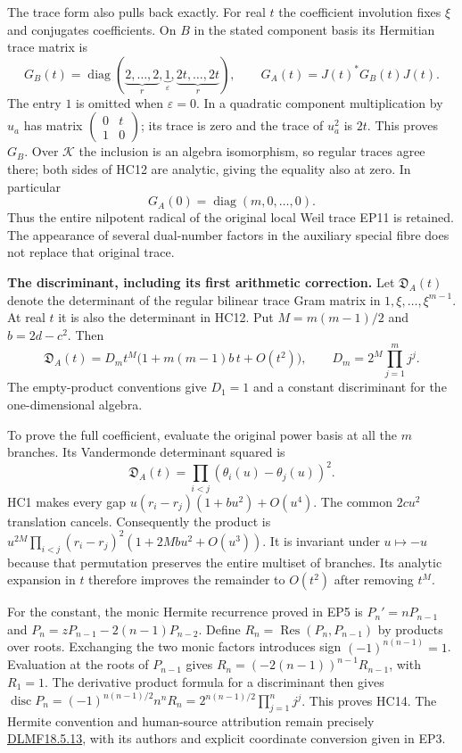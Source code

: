 The trace form also pulls back exactly. For real $t$ the coefficient
involution fixes $\xi$ and conjugates coefficients. On $B$ in the
stated component basis its Hermitian trace matrix is
\[
 G_B(t)=\operatorname{diag}
      (\underbrace{2,\ldots,2}_{r},
        \underbrace{1}_{\varepsilon},
        \underbrace{2t,\ldots,2t}_{r}),
 \qquad G_A(t)=J(t)^*G_B(t)J(t).
 \tag{HC12}
\]
The entry $1$ is omitted when $\varepsilon=0$. In a quadratic
component multiplication by $u_a$ has matrix
$\left(\begin{smallmatrix}0&t\\1&0\end{smallmatrix}\right)$;
its trace is zero and the trace of $u_a^2$ is $2t$. This proves
$G_B$. Over $\mathcal K$ the inclusion is an algebra isomorphism,
so regular traces agree there; both sides of HC12 are analytic,
giving the equality also at zero. In particular
\[
 G_A(0)=\operatorname{diag}(m,0,\ldots,0).
 \tag{HC13}
\]
Thus the entire nilpotent radical of the original local Weil trace
EP11 is retained. The appearance of several dual-number factors
in the auxiliary special fibre does not replace that original trace.

\HC\textbf{The discriminant, including its first arithmetic correction.}
Let $\mathfrak D_A(t)$ denote the determinant of the regular
bilinear trace Gram matrix in $1,\xi,\ldots,\xi^{m-1}$.
At real $t$ it is also the determinant in HC12. Put
$M=m(m-1)/2$ and $b=2d-c^2$. Then
\[
 \boxed{\mathfrak D_A(t)=D_m t^M
      \bigl(1+m(m-1)b\,t+O(t^2)\bigr),\qquad
 D_m=2^M\prod_{j=1}^m j^j.}
 \tag{HC14}
\]
The empty-product conventions give $D_1=1$ and a constant
discriminant for the one-dimensional algebra.

To prove the full coefficient, evaluate the original power basis at
all the $m$ branches. Its Vandermonde determinant squared is
\[
 \mathfrak D_A(t)=\prod_{i<j}
                    (\theta_i(u)-\theta_j(u))^2.
 \tag{HC15}
\]
HC1 makes every gap $u(r_i-r_j)(1+bu^2)+O(u^4)$.
The common $2cu^2$ translation cancels. Consequently the product
is $u^{2M}\prod_{i<j}(r_i-r_j)^2(1+2Mb u^2+O(u^3))$.
It is invariant under $u\mapsto-u$ because that permutation
preserves the entire multiset of branches. Its analytic expansion
in $t$ therefore improves the remainder to $O(t^2)$ after removing
$t^M$.

For the constant, the monic Hermite recurrence proved in EP5 is
$P_n'=nP_{n-1}$ and $P_n=zP_{n-1}-2(n-1)P_{n-2}$.
Define $R_n=\operatorname{Res}(P_n,P_{n-1})$ by products over roots.
Exchanging the two monic factors introduces sign
$(-1)^{n(n-1)}=1$. Evaluation at the roots of $P_{n-1}$ gives
$R_n=(-2(n-1))^{n-1}R_{n-1}$, with $R_1=1$.
The derivative product formula for a discriminant then gives
$\operatorname{disc}P_n=(-1)^{n(n-1)/2}n^nR_n
=2^{n(n-1)/2}\prod_{j=1}^n j^j$. This proves HC14.
The Hermite convention and human-source attribution remain precisely
\href{https://dlmf.nist.gov/18.5.E13}{DLMF18.5.13}, with its authors
and explicit coordinate conversion given in EP3.


